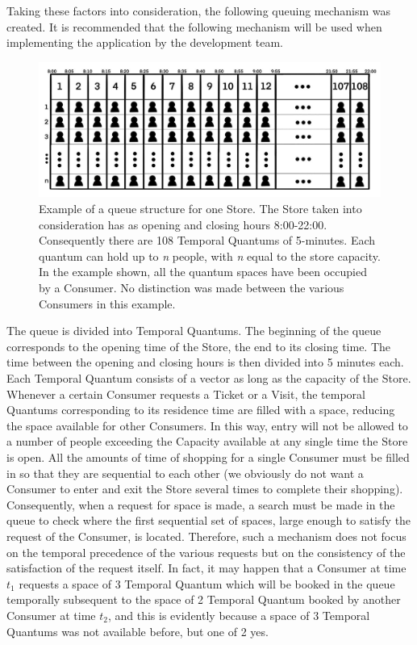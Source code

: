 \documentclass[a4paper, 12pt, oneside, table]{article}
\begin{document}
Taking these factors into consideration, the following queuing mechanism was created. It is recommended that the following mechanism will be used when implementing the application by the development team.\\
\begin{figure}[hbt]
\centering
	\centering
  	\includegraphics[height=0.2\textheight, scale=0.2, keepaspectratio]{img/queue/queue_general.jpg} 
	\caption{Example of a queue structure for one Store. The Store taken into consideration has as opening and closing hours 8:00-22:00. Consequently there are 108 Temporal Quantums of 5-minutes. Each quantum can hold up to \textit{n} people, with \textit{n} equal to the store capacity. In the example shown, all the quantum spaces have been occupied by a Consumer. No distinction was made between the various Consumers in this example.}
 	\label{entering}
\end{figure}
The queue is divided into Temporal Quantums. The beginning of the queue corresponds to the opening time of the Store, the end to its closing time. The time between the opening and closing hours is then divided into 5 minutes each. Each Temporal Quantum consists of a vector as long as the capacity of the Store. Whenever a certain Consumer requests a Ticket or a Visit, the temporal Quantums corresponding to its residence time are filled with a space, reducing the space available for other Consumers. In this way, entry will not be allowed to a number of people exceeding the Capacity available at any single time the Store is open. All the amounts of time of shopping for a single Consumer must be filled in so that they are sequential to each other (we obviously do not want a Consumer to enter and exit the Store several times to complete their shopping). Consequently, when a request for space is made, a search must be made in the queue to check where the first sequential set of spaces, large enough to satisfy the request of the Consumer, is located. Therefore, such a mechanism does not focus on the temporal precedence of the various requests but on the consistency of the satisfaction of the request itself. In fact, it may happen that a Consumer at time $t_1$ requests a space of 3 Temporal Quantum which will be booked in the queue temporally subsequent to the space of 2 Temporal Quantum booked by another Consumer at time $t_2$, and this is evidently because a space of 3 Temporal Quantums was not available before, but one of 2 yes.\\
\end{document}
